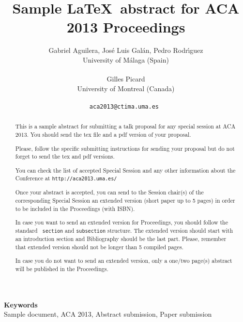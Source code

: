 \documentclass[a4paper]{article} %
\date{} %
\def\keywords#1{\begin{center}{\bf Keywords}\\{#1}\end{center}} %
\def\titulo#1{\title{#1}} %
\def\autores#1{\author{#1}} %
\begin{document}
\titulo{Sample \LaTeX\ abstract for ACA 2013 Proceedings}

\autores{Gabriel Aguilera, Jos\'e Luis Gal\'an, Pedro Rodr\'{\i}guez \\ %
       University of M\'alaga (Spain) \\ \\ %
       Gilles Picard \\ %
       University of Montreal (Canada) \\ \\ %
       \tt{aca2013@ctima.uma.es} %
       }%


\maketitle

\thispagestyle{empty}




\begin{abstract}
This is a sample abstract for submitting a talk proposal for any special session at ACA 2013. You
should send the tex file and a pdf version of your proposal.

Please, follow the specific submitting instructions for sending your proposal but do not forget to
send the tex and pdf versions.

You can check the list of accepted Special Session and any other information about the Conference
at {\tt http://aca2013.uma.es/}

Once your abstract is accepted, you can send to the Session chair(s) of the corresponding Special
Session an extended version (short paper up to 5 pages) in order to be included in the Proceedings
(with ISBN).

In case you want to send an extended version for Proceedings, you should follow the standard {\tt
section} and {\tt subsection} structure. The extended version should start with an introduction
section and Bibliography should be the last part. Please, remember that extended version should not
be longer than 5 compiled pages.

In case you do not want to send an extended version, only a one/two page(s) abstract will be
published in the Proceedings.

\end{abstract}

\keywords{Sample document, ACA 2013, Abstract submission, Paper submission} %






\end{document}
